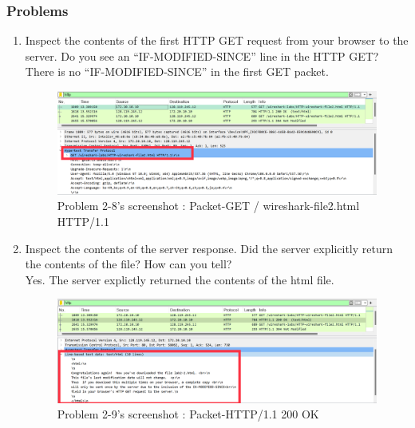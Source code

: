     \subsubsection*{Problems}
    \begin{enumerate}[label=\bfseries Problem \arabic*:,leftmargin=*,labelindent=1em]\addtocounter{enumi}{7}
        \item Inspect the contents of the first HTTP GET request from your browser to the server.
        Do you see an “IF-MODIFIED-SINCE” line in the HTTP GET? \\[0.2mm]
            \soln There is no “IF-MODIFIED-SINCE” in the first GET packet.
            \begin{figure}[!h]\centering
            \hspace{10mm} 
        		\includegraphics[width=.78\textwidth]{image/result_week01/Q2-8.png}
        		\caption{\footnotesize Problem 2-8's screenshot : Packet-GET / wireshark-file2.html HTTP/1.1}
        		\vspace{-10pt}
            \end{figure}    
        \item Inspect the contents of the server response. Did the server explicitly return 
        the contents of the file? How can you tell? \\[0.2mm]
            \soln Yes. The server explictly returned the contents of the html file.
            \begin{figure}[!h]\centering
            \hspace{10mm} 
        		\includegraphics[width=.79\textwidth]{image/result_week01/Q2-9.png}
        		\caption{\footnotesize Problem 2-9's screenshot : Packet-HTTP/1.1 200 OK}

\end{figure}
\end{enumerate}
